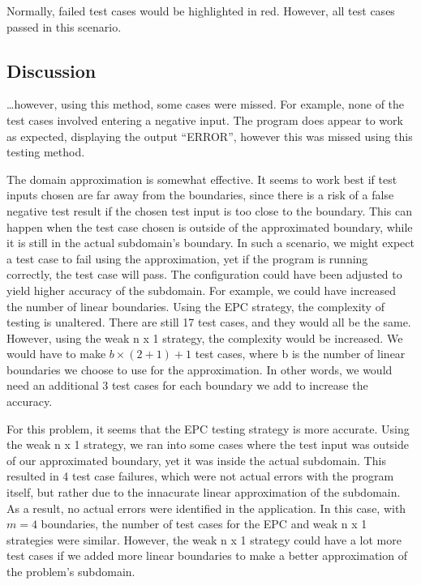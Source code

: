 Normally, failed test cases would be highlighted in red. However, all test
cases passed in this scenario.


\subsection{Discussion}


\dots however,  using this method, some cases were missed. For example,
none of the test cases involved entering a negative input. The program does
appear to work as expected, displaying the output ``ERROR'', however
this was missed using this testing method. 



The domain approximation is somewhat effective. It seems to work best if
test inputs chosen are far away from the boundaries, since there is a risk
of a false negative test result if the chosen test input is too close to the
boundary. This can happen when the test case chosen is outside of the
approximated boundary, while it is still in the actual subdomain's boundary.
In such a scenario, we might expect a test case to fail using the
approximation, yet if the program is running correctly, the test case will
pass. The configuration could have been adjusted to yield higher accuracy
of the subdomain. For example, we could have increased the number of linear
boundaries. Using the EPC strategy, the complexity of testing is unaltered.
There are still 17 test cases, and they would all be the same. However,
using the weak n x 1 strategy, the complexity would be increased.
We would have to make $b \times (2 + 1) + 1$ test cases, where b is
the number of linear boundaries we choose to use for the approximation.
In other words, we would need an additional 3 test cases for each boundary
we add to increase the accuracy.

For this problem, it seems that the EPC testing strategy is more accurate.
Using the weak n x 1 strategy, we ran into some cases where the test input
was outside of our approximated boundary, yet it was inside the actual
subdomain. This resulted in 4 test case failures, which were not actual
errors with the program itself, but rather due to the innacurate linear
approximation of the subdomain. As a result, no actual errors were identified
in the application. In this case, with $m=4$ boundaries, the number of test
cases for the EPC and weak n x 1 strategies were similar. However,
the weak n x 1 strategy could have a lot more test cases if we added more
linear boundaries to make a better approximation of the problem's subdomain.
